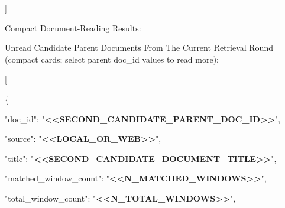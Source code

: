 \begin{tcolorbox}[colback=white, colframe=my-green, coltitle=black, parskip=5mm, title=\textbf{Hop Resolve}, halign=flush left, enhanced, breakable, skin first=enhanced, skin middle=enhanced, skin last=enhanced]
\begin{scriptsize}
]\par
\mbox{}\par
Compact Document-Reading Results:\par
[\par
  \{\par
    "doc\_id": "\textcolor{my-green}{\textbf{\textless{}\textless{}EVIDENCE\_DOC\_ID\textgreater{}\textgreater{}}}",\par
    "source": "\textcolor{my-green}{\textbf{\textless{}\textless{}LOCAL\_OR\_WEB\textgreater{}\textgreater{}}}",\par
    "title": "\textcolor{my-green}{\textbf{\textless{}\textless{}EVIDENCE\_DOCUMENT\_TITLE\textgreater{}\textgreater{}}}",\par
    "can\_answer": true,\par
    "proposed\_answer": "\textcolor{my-green}{\textbf{\textless{}\textless{}PROPOSED\_SHORT\_ANSWER\textgreater{}\textgreater{}}}",\par
    "justification": "\textcolor{my-green}{\textbf{\textless{}\textless{}DOCUMENT\_READER\_JUSTIFICATION\_WITH\_DOC\_CITATION\textgreater{}\textgreater{}}}",\par
    "confidence": "\textcolor{my-green}{\textbf{\textless{}\textless{}CONFIDENCE\_SCORE\textgreater{}\textgreater{}}}"\par
  \}\par
]\par
\mbox{}\par
Unread Candidate Parent Documents From The Current Retrieval Round (compact cards; select parent doc\_id values to read more):\par
[\par
  \{\par
    "doc\_id": "\textcolor{my-green}{\textbf{\textless{}\textless{}SECOND\_CANDIDATE\_PARENT\_DOC\_ID\textgreater{}\textgreater{}}}",\par
    "source": "\textcolor{my-green}{\textbf{\textless{}\textless{}LOCAL\_OR\_WEB\textgreater{}\textgreater{}}}",\par
    "title": "\textcolor{my-green}{\textbf{\textless{}\textless{}SECOND\_CANDIDATE\_DOCUMENT\_TITLE\textgreater{}\textgreater{}}}",\par
    "matched\_window\_count": "\textcolor{my-green}{\textbf{\textless{}\textless{}N\_MATCHED\_WINDOWS\textgreater{}\textgreater{}}}",\par
    "total\_window\_count": "\textcolor{my-green}{\textbf{\textless{}\textless{}N\_TOTAL\_WINDOWS\textgreater{}\textgreater{}}}",\par

\end{scriptsize}
\end{tcolorbox}
